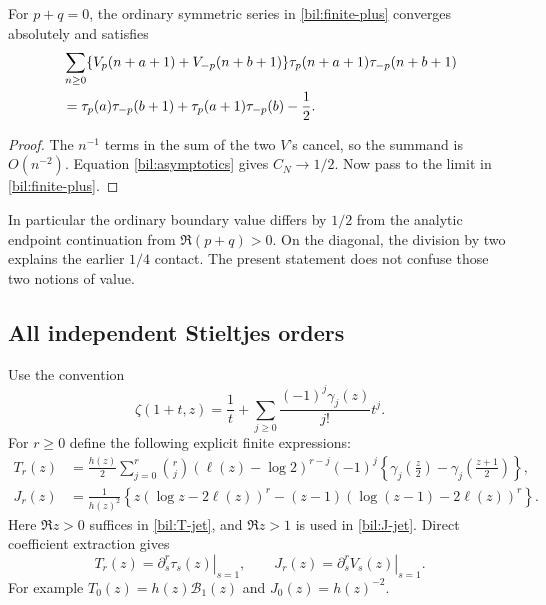 \begin{corollary}\label{bil:contact}
For $p+q=0$, the ordinary symmetric series in
\eqref{bil:finite-plus} converges absolutely and satisfies
\begin{align}
 &\sum_{n\ge0}\{V_p(n+a+1)+V_{-p}(n+b+1)\}
           \tau_p(n+a+1)\tau_{-p}(n+b+1)\notag\\
 &=\tau_p(a)\tau_{-p}(b+1)
        +\tau_p(a+1)\tau_{-p}(b)-\frac12.\label{bil:contact-half}
\end{align}
\end{corollary}
\begin{proof}
The $n^{-1}$ terms in the sum of the two $V$'s cancel, so the
summand is $O(n^{-2})$. Equation \eqref{bil:asymptotics} gives
$C_N\to1/2$. Now pass to the limit in \eqref{bil:finite-plus}.
\end{proof}
In particular the ordinary boundary value differs by $1/2$ from the
analytic endpoint continuation from $\Re(p+q)>0$. On the diagonal,
the division by two explains the earlier $1/4$ contact. The present
statement does not confuse those two notions of value.

\subsection{All independent Stieltjes orders}

Use the convention
\[
 \zeta(1+t,z)=\frac1t+
       \sum_{j\ge0}\frac{(-1)^j\gamma_j(z)}{j!}t^j.
\]
For $r\ge0$ define the following explicit finite expressions:
\begin{align}
 T_r(z)&=\frac{h(z)}2
  \sum_{j=0}^{r}\binom rj
  (\ell(z)-\log2)^{r-j}(-1)^j
  \left\{\gamma_j\left(\frac z2\right)
         -\gamma_j\left(\frac{z+1}{2}\right)\right\},
                                        \label{bil:T-jet}\\
 J_r(z)&=\frac1{h(z)^2}
  \left\{z(\log z-2\ell(z))^r
      -(z-1)(\log(z-1)-2\ell(z))^r\right\}.
                                        \label{bil:J-jet}
\end{align}
Here $\Re z>0$ suffices in \eqref{bil:T-jet}, and $\Re z>1$ is
used in \eqref{bil:J-jet}. Direct coefficient extraction gives
\[
 T_r(z)=\left.\partial_s^r\tau_s(z)\right|_{s=1},\qquad
 J_r(z)=\left.\partial_s^r V_s(z)\right|_{s=1}.
\]
For example $T_0(z)=h(z)\mathcal B_1(z)$ and $J_0(z)=h(z)^{-2}$.

